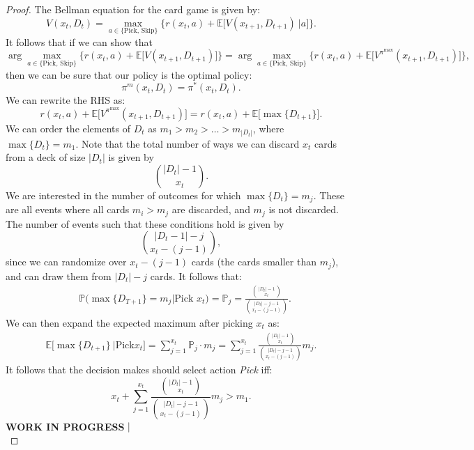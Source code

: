 \documentclass{article}
\begin{document}
\begin{proof}
    The Bellman equation for the card game is given by:
    \begin{equation}
        V(x_t, D_t) =  \max_{a \in \{\text{Pick, Skip}\}}\Big\{r(x_t,a) + \mathbb{E}\Big[V(x_{t+1}, D_{t+1}) \ | a \Big]\Big\}.
    \end{equation}
    It follows that if we can show that
    \begin{equation}
        \arg \max_{a \in \{\text{Pick, Skip}\}}\Big\{r(x_t,a) + \mathbb{E}\Big[V(x_{t+1}, D_{t+1})\Big]\Big\} = \arg \max_{a \in \{\text{Pick, Skip}\}}\Big\{r(x_t,a) + \mathbb{E}\Big[V^{\pi^{\max}}(x_{t+1}, D_{t+1})\Big]\Big\},
    \end{equation}
    then  we can be sure that our policy is the optimal policy:
    \begin{equation}
        \pi^m(x_t, D_t) = \pi^*(x_t, D_t).
    \end{equation}
    We can rewrite the RHS as:
    \begin{equation}
        r(x_t,a) + \mathbb{E}\Big[V^{\pi^{\max}}(x_{t+1}, D_{t+1})\Big] = r(x_t,a) + \mathbb{E}\big[\max\{D_{t+1}\}\big].
    \end{equation}
    We can order the elements of $D_t$ as $m_1 > m_2 > \dots > m_{|D_t|}$, where $\max\{D_t\} = m_1$.
    Note that the total number of ways we can discard $x_t$ cards from a deck of size $|D_t|$ is given by
    \begin{equation}
        \binom{|D_t|-1}{x_t}.
    \end{equation}
    We are interested in the number of outcomes for which $\max\{D_t\}=m_j$. These are all events where all cards $m_i>m_j$ are discarded, and $m_j$ is not discarded. The number of events such that these conditions hold is given by
    \begin{equation}
        \binom{|D_t-1|-j}{x_t-(j-1)},
    \end{equation}
    since we can randomize over $x_t-(j-1)$ cards (the cards smaller than $m_j$), and can draw them from $|D_t|-j$ cards. It follows that:
    \begin{align}
         & \mathbb{P}\Big(\max\{D_{T+1}\}  = m_j \big| \text{Pick } x_t\Big) = \mathbb{P}_j  = \frac{\binom{|D_t|-1}{x_t}}{\binom{|D_t|-j-1}{x_t-(j-1)}} .
    \end{align}
    We can then expand the expected maximum after picking $x_t$ as:
    \begin{align}
        \mathbb{E}\big[\max\{D_{t+1}\} \ | \text{Pick} x_t\big] = \sum^{x_t}_{j=1} \mathbb{P}_j\cdot m_j = \sum^{x_t}_{j=1} \frac{\binom{|D_t|-1}{x_t}}{\binom{|D_t|-j-1}{x_t-(j-1)}}  m_j.
    \end{align}
    It follows that the decision makes should select action \textit{Pick} iff:
    \begin{equation}
        x_t+ \sum^{x_t}_{j=1} \frac{\binom{|D_t|-1}{x_t}}{\binom{|D_t|-j-1}{x_t-(j-1)}}  m_j > m_1.
    \end{equation}
    \textbf{WORK IN PROGRESS }$\arrowvert$\\


\end{proof}
\end{document}
